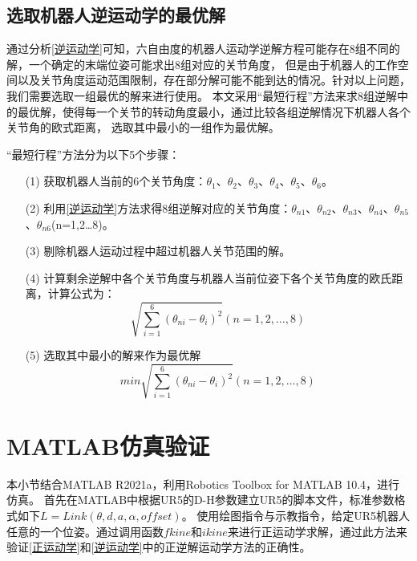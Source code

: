 \documentclass{seuthesis-2022}
\numberwithin{equation}{section}
\begin{document}
\subsection{选取机器人逆运动学的最优解}
通过分析\ref{逆运动学}可知，六自由度的机器人运动学逆解方程可能存在8组不同的解，一个确定的末端位姿可能求出8组对应的关节角度，
但是由于机器人的工作空间以及关节角度运动范围限制，存在部分解可能不能到达的情况。针对以上问题，我们需要选取一组最优的解来进行使用。
本文采用“最短行程”方法来求8组逆解中的最优解，使得每一个关节的转动角度最小，通过比较各组逆解情况下机器人各个关节角的欧式距离，
选取其中最小的一组作为最优解\cite{周国义20096}。

“最短行程”方法分为以下5个步骤：
\begin{itemize}
  \item [(1)]
  获取机器人当前的6个关节角度：$\theta_1$、$\theta_2$、$\theta_3$、$\theta_4$、$\theta_5$、$\theta_6$。
  \item [(2)]
  利用\ref{逆运动学}方法求得8组逆解对应的关节角度：$\theta_{n1}$、$\theta_{n2}$、$\theta_{n3}$、$\theta_{n4}$、$\theta_{n5}$、$\theta_{n6}$(n=1,2\dots 8)。
  \item [(3)]
  剔除机器人运动过程中超过机器人关节范围的解。
  \item [(4)]
  计算剩余逆解中各个关节角度与机器人当前位姿下各个关节角度的欧氏距离，计算公式为：
  \begin{equation}
    \sqrt{\sum_{i = 1}^{6} (\theta_{ni}-\theta_i)^2 } (n=1,2,\dots ,8)
  \end{equation}
  \item [(5)]
  选取其中最小的解来作为最优解
  \begin{equation}
    min\sqrt{\sum_{i = 1}^{6} (\theta_{ni}-\theta_i)^2 } (n=1,2,\dots ,8)
  \end{equation}
\end{itemize}



\section{MATLAB仿真验证}
本小节结合MATLAB R2021a，利用Robotics Toolbox for MATLAB 10.4，进行仿真。
首先在MATLAB中根据UR5的D-H参数建立UR5的脚本文件，标准参数格式如下$L = Link(\theta , d , a , \alpha , offset)$。
使用绘图指令与示教指令，给定UR5机器人任意的一个位姿。通过调用函数$fkine$和$ikine$来进行正运动学求解，通过此方法来验证\ref{正运动学}和\ref{逆运动学}中的正逆解运动学方法的正确性。
\end{document}
